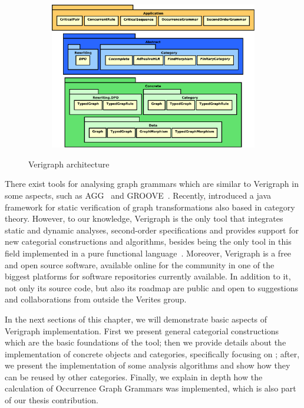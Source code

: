 \begin{figure}[!ht]
  \centering
  \begin{subfigure}[t]{.5\textwidth}
    \centerline{\includegraphics[scale=0.6]{images/verigraph/layers}}
  \end{subfigure}
  \caption{Verigraph architecture}\label{fig:verigraph:layers}
\end{figure}
There exist tools for analysing graph grammars which are similar to Verigraph in some aspects, such as AGG~\cite{Taentzer2000} and GROOVE~\cite{Rensink2004}. Recently, \cite{Deckwerth2016} introduced a java framework for static verification of graph transformations also based in category theory.  However, to our knowledge, Verigraph is the only tool that integrates static and dynamic analyses, second-order specifications and provides support for new categorial constructions and algorithms, besides being the only tool in this field implemented in a pure functional language~\cite{Costa2016}. Moreover, Verigraph is a free and open source software, available online for the community in one of the biggest platforms for software repositories currently available. In addition to it, not only its source code, but also its roadmap are public and open to suggestions and collaborations from outside the Verites group.

In the next sections of this chapter, we will demonstrate basic aspects of Verigraph implementation. First we present general categorial constructions which are the basic foundations of the tool; then we provide details about the implementation of concrete objects and categories, specifically focusing on \typedGraphCategory{}; after, we present the implementation of some analysis algorithms and show how they can be reused by other categories. Finally, we explain in depth how the calculation of Occurrence Graph Grammars was implemented, which is also part of our thesis contribution.

